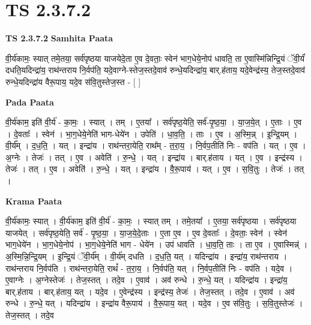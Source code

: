 \documentclass[17pt]{extarticle}
\begin{document}
\section*{ TS 2.3.7.2 }

\textbf{TS 2.3.7.2 } \newline
\textbf{Samhita Paata} \newline

वी॒र्य॑कामः॒ स्यात् तमे॒तया॒ सर्व॑पृष्ठया याजयेदे॒ता ए॒व दे॒वताः॒ स्वेन॑ भाग॒धेये॒नोप॑ धावति॒ ता ए॒वास्मि॑न्निन्द्रि॒यं ॅवी॒र्यं॑ दधति॒यदिन्द्रा॑य॒ राथ॑न्तराय नि॒र्वप॑ति॒ यदे॒वाग्ने-स्तेज॒स्तदे॒वाव॑ रुन्धे॒यदिन्द्रा॑य॒ बार्.ह॑ताय॒ यदे॒वेन्द्र॑स्य॒ तेज॒स्तदे॒वाव॑ रुन्धे॒यदिन्द्रा॑य वैरू॒पाय॒ यदे॒व स॑वि॒तुस्तेज॒स्त - [  ] \newline

\textbf{Pada Paata} \newline

वी॒र्य॑काम॒ इति॑ वी॒र्य॑ - का॒मः॒ । स्यात् । तम् । ए॒तया᳚ । सर्व॑पृष्ठ॒येति॒ सर्व॑-पृ॒ष्ठ॒या॒ । या॒ज॒ये॒त् । ए॒ताः । ए॒व । दे॒वताः᳚ । स्वेन॑ । भा॒ग॒धेये॒नेति॑ भाग-धेये॑न । उपेति॑ । धा॒व॒ति॒ । ताः । ए॒व । अ॒स्मि॒न्न् । इ॒न्द्रि॒यम् । वी॒र्य᳚म् । द॒ध॒ति॒ । यत् । इन्द्रा॑य । राथ॑न्तरा॒येति॒ राथ᳚म् - त॒रा॒य॒ । नि॒र्वप॒तीति॑ निः - वप॑ति । यत् । ए॒व । अ॒ग्नेः । तेजः॑ ।   तत् । ए॒व । अवेति॑ । रु॒न्धे॒ । यत् । इन्द्रा॑य । बार्.ह॑ताय । यत् । ए॒व । इन्द्र॑स्य । तेजः॑ । तत् । ए॒व । अवेति॑ ।   रु॒न्धे॒ । यत् । इन्द्रा॑य । वै॒रू॒पाय॑ । यत् । ए॒व । स॒वि॒तुः । तेजः॑ । तत् ।  \newline


\textbf{Krama Paata} \newline

वी॒र्य॑कामः॒ स्यात् । वी॒र्य॑काम॒ इति॑ वी॒र्य॑ - का॒मः॒ । स्यात् तम् । तमे॒तया᳚ । ए॒तया॒ सर्व॑पृष्ठया । सर्व॑पृष्ठया याजयेत् । सर्व॑पृष्ठ॒येति॒ सर्व॑ - पृ॒ष्ठ॒या॒ । या॒ज॒ये॒दे॒ताः । ए॒ता ए॒व । ए॒व दे॒वताः᳚ । दे॒वताः॒ स्वेन॑ । स्वेन॑ भाग॒धेये॑न । भा॒ग॒धेये॒नोप॑ । भा॒ग॒धेये॒नेति॑ भाग - धेये॑न । उप॑ धावति । धा॒व॒ति॒ ताः । ता ए॒व । ए॒वास्मिन्न्॑ । अ॒स्मि॒न्नि॒न्द्रि॒यम् । इ॒न्द्रि॒यं ॅवी॒र्य᳚म् । वी॒र्य॑म् दधति । द॒ध॒ति॒ यत् । यदिन्द्रा॑य । इन्द्रा॑य॒ राथ॑न्तराय । राथ॑न्तराय नि॒र्वप॑ति । राथ॑न्तरा॒येति॒ राथं᳚ - त॒रा॒य॒ । नि॒र्वप॑ति॒ यत् । नि॒र्वप॒तीति॑ निः - वप॑ति । यदे॒व । ए॒वाग्नेः । अ॒ग्नेस्तेजः॑ । तेज॒स्तत् । तदे॒व । ए॒वाव॑ । अव॑ रुन्धे । रु॒न्धे॒ यत् । यदिन्द्रा॑य । इन्द्रा॑य॒ बार्.ह॑ताय । बार्.ह॑ताय॒ यत् । यदे॒व । ए॒वेन्द्र॑स्य । इन्द्र॑स्य॒ तेजः॑ । तेज॒स्तत् । तदे॒व । ए॒वाव॑ । अव॑ रुन्धे । रु॒न्धे॒ यत् । यदिन्द्रा॑य । इन्द्रा॑य वैरू॒पाय॑ । वै॒रू॒पाय॒ यत् । यदे॒व । ए॒व स॑वि॒तुः । स॒वि॒तुस्तेजः॑ । तेज॒स्तत् । तदे॒व \newline
\end{document}
